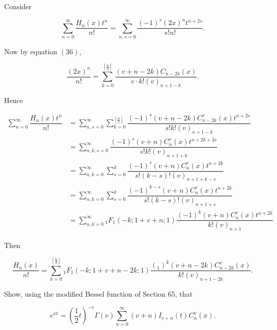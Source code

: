 \begin{solution}
Consider 

$$\displaystyle\sum_{n=0}^{\infty} \dfrac{H_n(x) t^n}{n!} = \displaystyle\sum_{n,s=0}^{\infty} \dfrac{(-1)^s (2x)^n t^{n+2s}}{s! n!}.$$

Now by equation $(36)$,


$$\dfrac{(2x)^n}{n!} = \displaystyle\sum_{k=0}^{[\frac{n}{2}]} \dfrac{(v+n-2k)C_{n-2k}(x)}{v \cdot k! (v)_{n+1-k}}.$$

Hence

$$\begin{array}{ll}
\displaystyle\sum_{n=0}^{\infty} \dfrac{H_n(x) t^n}{n!} &= \displaystyle\sum_{n,s=0}^{\infty} \displaystyle\sum_{k=0}^{[\frac{n}{2}]} \dfrac{(-1)^s (v+n-2k) C_{n-2k}^v(x) t^{n+2s}}{s! k! (v)_{n+1-k}} \\
&= \displaystyle\sum_{n,k,s=0}^{\infty} \dfrac{(-1)^s (v+n) C_n^v(x) t^{n+2k+2s}}{s! k! (v)_{n+1+k}} \\
&= \displaystyle\sum_{n,k=0}^{\infty} \displaystyle\sum_{s=0}^k \dfrac{(-1)^s (v+n) C_n^v(x) t^{n+2k}}{s! (k-s)! (v)_{n+1+k-s}} \\
&= \displaystyle\sum_{n,k=0}^{\infty} \displaystyle\sum_{s=0}^k \dfrac{(-1)^{k-s} (v+n) C_n^v(x) t^{n+2k}}{s! (k-s)! (v)_{n+1+s}} \\
&= \displaystyle\sum_{n,k=0}^{\infty} {}_1F_1(-k;1+v+n;1) \dfrac{(-1)^k (v+n) C_n^v(x) t^{n+2k}}{k! (v)_{n+1}}
\end{array}$$

Then

$$\dfrac{H_n(x)}{n!} = \displaystyle\sum_{k=0}^{[\frac{n}{2}]} {}_1F_1(-k;1+v+n-2k;1) \dfrac{(_1)^k (v+n-2k) C_{n-2k}^v(x)}{k! (v)_{n+1-2k}}.$$
\end{solution}
\begin{problem}\label{problem3chapter17}
Show, using the modified Bessel function of Section 65, that

$$e^{xt}= \left(\dfrac{1}{2}t \right)^{-v} \Gamma(v) \displaystyle\sum_{n=0}^{\infty} (v+n) I_{v+n}(t) C_n^v(x).$$
\end{problem}
